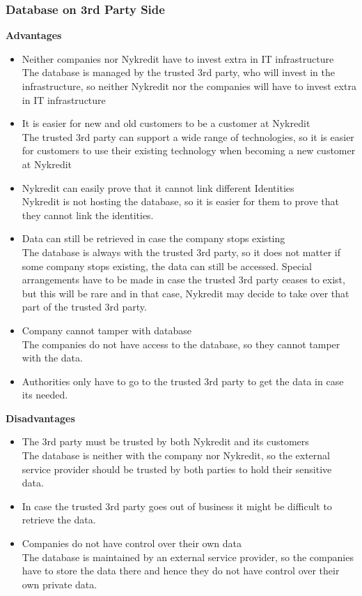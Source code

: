 \subsubsection{Database on 3rd Party Side}
\textbf{Advantages}
\begin{itemize}
	\item Neither companies nor Nykredit have to invest extra in IT infrastructure
	\\The database is managed by the trusted 3rd party, who will invest in the infrastructure, so neither Nykredit nor the companies will have to invest extra in IT infrastructure
	\item It is easier for new and old customers to be a customer at Nykredit
	\\The trusted 3rd party can support a wide range of technologies, so it is easier for customers to use their existing technology when becoming a new customer at Nykredit
	\item Nykredit can easily prove that it cannot link different Identities
	\\Nykredit is not hosting the database, so it is easier for them to prove that they cannot link the identities.
	\item Data can still be retrieved in case the company stops existing 
	\\The database is always with the trusted 3rd party, so it does not matter if some company stops existing, the data can still be accessed. Special arrangements have to be made in case the trusted 3rd party ceases to exist, but this will be rare and in that case, Nykredit may decide to take over that part of the trusted 3rd party.
	\item Company cannot tamper with database
	\\The companies do not have access to the database, so they cannot tamper with the data.
	\item Authorities only have to go to the trusted 3rd party to get the data in case its needed.
\end{itemize}
\textbf{Disadvantages}
\begin{itemize}
	\item The 3rd party must be trusted by both Nykredit and its customers
	\\The database is neither with the company nor Nykredit, so the external service provider should be trusted by both parties to hold their sensitive data.
	\item In case the trusted 3rd party goes out of business it might be difficult to retrieve the data.
	\item Companies do not have control over their own data
	\\The database is maintained by an external service provider, so the companies have to store the data there and hence they do not have control over their own private data.
\end{itemize}
